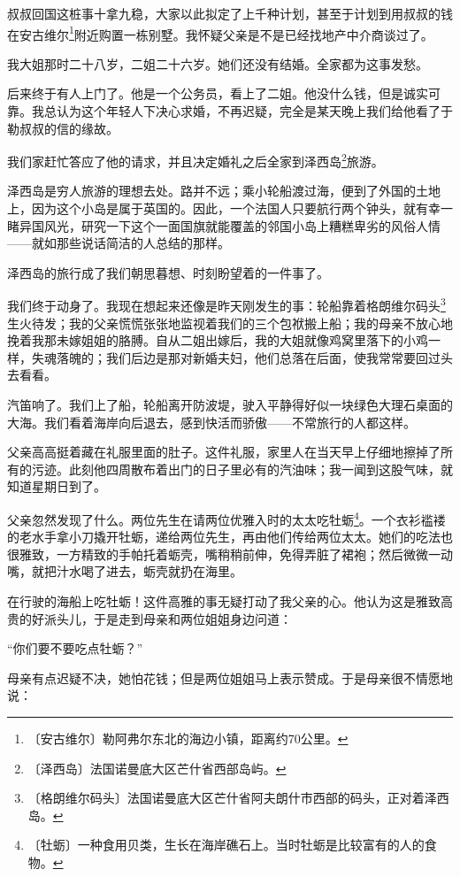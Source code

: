\documentclass[12pt,UTF-8,openany]{ctexbook}
\begin{document}
\begin{normalsize}
    叔叔回国这桩事十拿九稳，大家以此拟定了上千种计划，甚至于计划到用叔叔的钱在安古维尔\footnote{〔安古维尔〕勒阿弗尔东北的海边小镇，距离约70公里。}附近购置一栋别墅。我怀疑父亲是不是已经找地产中介商谈过了。
    
    我大姐那时二十八岁，二姐二十六岁。她们还没有结婚。全家都为这事发愁。
    
    后来终于有人上门了。他是一个公务员，看上了二姐。他没什么钱，但是诚实可靠。我总认为这个年轻人下决心求婚，不再迟疑，完全是某天晚上我们给他看了于勒叔叔的信的缘故。
    
    我们家赶忙答应了他的请求，并且决定婚礼之后全家到泽西岛\footnote{〔泽西岛〕法国诺曼底大区芒什省西部岛屿。}旅游。
    
    泽西岛是穷人旅游的理想去处。路并不远；乘小轮船渡过海，便到了外国的土地上，因为这个小岛是属于英国的。因此，一个法国人只要航行两个钟头，就有幸一睹异国风光，研究一下这个一面国旗就能覆盖的邻国小岛上糟糕卑劣的风俗人情——就如那些说话简洁的人总结的那样。
    
    泽西岛的旅行成了我们朝思暮想、时刻盼望着的一件事了。
    
    我们终于动身了。我现在想起来还像是昨天刚发生的事：轮船靠着格朗维尔码头\footnote{〔格朗维尔码头〕法国诺曼底大区芒什省阿夫朗什市西部的码头，正对着泽西岛。}生火待发；我的父亲慌慌张张地监视着我们的三个包袱搬上船；我的母亲不放心地挽着我那未嫁姐姐的胳膊。自从二姐出嫁后，我的大姐就像鸡窝里落下的小鸡一样，失魂落魄的；我们后边是那对新婚夫妇，他们总落在后面，使我常常要回过头去看看。
    
    汽笛响了。我们上了船，轮船离开防波堤，驶入平静得好似一块绿色大理石桌面的大海。我们看着海岸向后退去，感到快活而骄傲——不常旅行的人都这样。
    
    父亲高高挺着藏在礼服里面的肚子。这件礼服，家里人在当天早上仔细地擦掉了所有的污迹。此刻他四周散布着出门的日子里必有的汽油味；我一闻到这股气味，就知道星期日到了。
    
    父亲忽然发现了什么。两位先生在请两位优雅入时的太太吃牡蛎\footnote{〔牡蛎〕一种食用贝类，生长在海岸礁石上。当时牡蛎是比较富有的人的食物。}。一个衣衫褴褛的老水手拿小刀撬开牡蛎，递给两位先生，再由他们传给两位太太。她们的吃法也很雅致，一方精致的手帕托着蛎壳，嘴稍稍前伸，免得弄脏了裙袍；然后微微一动嘴，就把汁水喝了进去，蛎壳就扔在海里。
    
    在行驶的海船上吃牡蛎！这件高雅的事无疑打动了我父亲的心。他认为这是雅致高贵的好派头儿，于是走到母亲和两位姐姐身边问道：
    
    “你们要不要吃点牡蛎？”
    
    母亲有点迟疑不决，她怕花钱；但是两位姐姐马上表示赞成。于是母亲很不情愿地说：
    

\end{normalsize}
\end{document}
